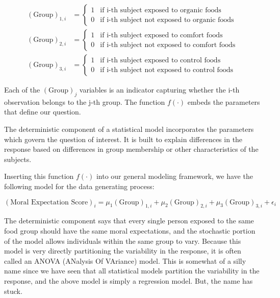 \documentclass[
]{book}
\theoremstyle{plain}
\theoremstyle{mydefn}
\theoremstyle{myexmpl}
\theoremstyle{remark}
\begin{document}
\[
\begin{aligned}
  (\text{Group})_{1,i} &= \begin{cases}
    1 & \text{if i-th subject exposed to organic foods} \\
    0 & \text{if i-th subject not exposed to organic foods} 
    \end{cases} \\
  (\text{Group})_{2,i} &= \begin{cases}
    1 & \text{if i-th subject exposed to comfort foods} \\
    0 & \text{if i-th subject not exposed to comfort foods} 
    \end{cases} \\
  (\text{Group})_{3,i} &= \begin{cases}
    1 & \text{if i-th subject exposed to control foods} \\
    0 & \text{if i-th subject not exposed to control foods}
    \end{cases}
\end{aligned}
\]

Each of the \((\text{Group})_{j}\) variables is an indicator capturing whether the i-th observation belongs to the j-th group. The function \(f(\cdot)\) embeds the parameters that define our question.

\begin{rmdkeyidea}
The deterministic component of a statistical model incorporates the parameters which govern the question of interest. It is built to explain differences in the response based on differences in group membership or other characteristics of the subjects.
\end{rmdkeyidea}

Inserting this function \(f(\cdot)\) into our general modeling framework, we have the following model for the data generating process:

\begin{equation}
  (\text{Moral Expectation Score})_i = \mu_1 (\text{Group})_{1,i} + \mu_2 (\text{Group})_{2,i} + \mu_3 (\text{Group})_{3,i} + \epsilon_i
  \label{eq:anova-model}
\end{equation}

The deterministic component says that every single person exposed to the same food group should have the same moral expectations, and the stochastic portion of the model allows individuals within the same group to vary. Because this model is very directly partitioning the variability in the response, it is often called an ANOVA (ANalysis Of VAriance) model. This is somewhat of a silly name since we have seen that all statistical models partition the variability in the response, and the above model is simply a regression model. But, the name has stuck.
\end{document}
